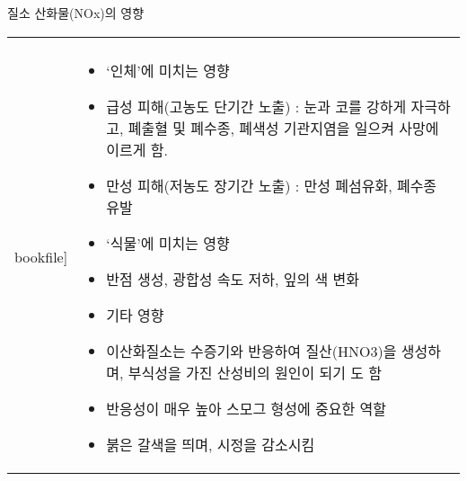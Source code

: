 \begin{frame}[t]{질소 산화물(NOx)의 영향}
	\begin{tabular}{ll}
		\begin{minipage}[t]{0.3\textwidth}\scriptsize
			\begin{figure}[t]
				\texttt{[image: \\bookfile]}
			\end{figure}
		\end{minipage}	
		&
		\begin{minipage}[t]{0.65\textwidth} \scriptsize	
			\begin{itemize}
				\item ‘인체’에 미치는 영향
				\item 급성 피해(고농도 단기간 노출) : 눈과 코를 강하게 자극하고, 폐출혈 및 폐수종, 폐색성 기관지염을 일으켜 사망에 이르게 함.
				\item 만성 피해(저농도 장기간 노출) : 만성 폐섬유화, 폐수종 유발
				
				\item ‘식물’에 미치는 영향
				\item 반점 생성, 광합성 속도 저하, 잎의 색 변화
				
				\item 기타 영향
				\item 이산화질소는 수증기와 반응하여 질산(HNO3)을 생성하며, 부식성을 가진 산성비의 원인이 되기 도 함
				\item 반응성이 매우 높아 스모그 형성에 중요한 역할
				\item 붉은 갈색을 띄며, 시정을 감소시킴
				
			\end{itemize}

		\end{minipage}
	\end{tabular}
\end{frame}



